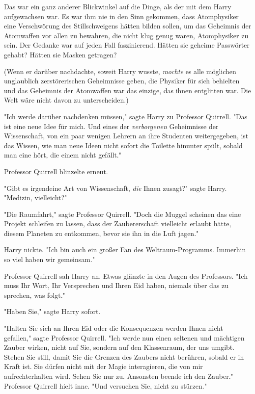 {Das war ein ganz anderer Blickwinkel auf die Dinge, als der mit dem Harry aufgewachsen war. Es war ihm nie in den Sinn gekommen, dass Atomphysiker eine Verschwörung des Stillschweigens hätten bilden sollen, um das Geheimnis der Atomwaffen vor allen zu bewahren, die nicht klug genug waren, Atomphysiker zu sein. Der Gedanke war auf jeden Fall faszinierend. Hätten sie geheime Passwörter gehabt? Hätten sie Masken getragen?

(Wenn er darüber nachdachte, soweit Harry wusste, \emph{mochte} es alle möglichen unglaublich zerstörerischen Geheimnisse geben, die Physiker für sich behielten und das Geheimnis der Atomwaffen war das einzige, das ihnen entglitten war. Die Welt wäre nicht davon zu unterscheiden.)

"Ich werde darüber nachdenken müssen," sagte Harry zu Professor Quirrell. "Das ist eine neue Idee für mich. Und eines der \emph{verborgenen} Geheimnisse der Wissenschaft, von ein paar wenigen Lehrern an ihre Studenten weitergegeben, ist das Wissen, wie man neue Ideen nicht sofort die Toilette hinunter spült, sobald man eine hört, die einem nicht gefällt."

Professor Quirrell blinzelte erneut.

"Gibt es irgendeine Art von Wissenschaft, \emph{die} Ihnen zusagt?" sagte Harry. "Medizin, vielleicht?"

"Die Raumfahrt," sagte Professor Quirrell. "Doch die Muggel scheinen das eine Projekt schleifen zu lassen, dass der Zaubererschaft vielleicht erlaubt hätte, diesem Planeten zu entkommen, bevor sie ihn in die Luft jagen."

Harry nickte. "Ich bin auch ein großer Fan des Weltraum-Programms. Immerhin so viel haben wir gemeinsam."

Professor Quirrell sah Harry an. Etwas glänzte in den Augen des Professors. "Ich muss Ihr Wort, Ihr Versprechen und Ihren Eid haben, niemals über das zu sprechen, was folgt."

"Haben Sie," sagte Harry sofort.

"Halten Sie sich an Ihren Eid oder die Konsequenzen werden Ihnen nicht gefallen," sagte Professor Quirrell. "Ich werde nun einen seltenen und mächtigen Zauber wirken, nicht auf Sie, sondern auf den Klassenraum, der uns umgibt. Stehen Sie still, damit Sie die Grenzen des Zaubers nicht berühren, sobald er in Kraft ist. Sie dürfen nicht mit der Magie interagieren, die von mir aufrechterhalten wird. Sehen Sie nur zu. Ansonsten beende ich den Zauber." Professor Quirrell hielt inne. "Und versuchen Sie, nicht zu stürzen."

}

